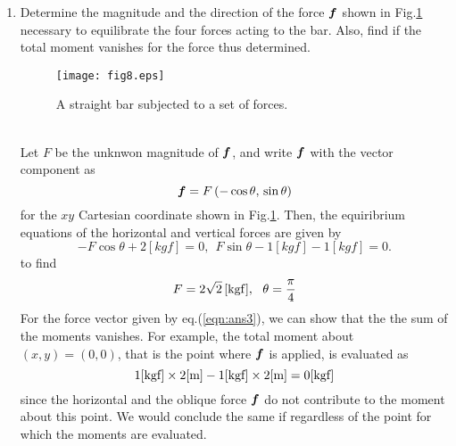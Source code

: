 \documentclass[10pt,a4j]{article}
\begin{document}
\begin{enumerate}
{		with respect to $P_1$ to $P_4$.
	}
\item
	Determine the magnitude and the direction of the force $\mbox{\boldmath $f$}$ shown in 
	Fig.\ref{fig:fig8} necessary to equilibrate the four forces acting to the bar.
	Also, find if the total moment vanishes for the force thus determined.  
	\begin{figure}[h]
		\begin{center}
		\texttt{[image: fig8.eps]} 
		\end{center}
		\caption{A straight bar subjected to a set of forces.} 
		\label{fig:fig8}
	\end{figure}
	\\

	{\small
		Let $F$ be the unknwon magnitude of $\mbox{\boldmath $f$}$, and write $\mbox{\boldmath $f$}$ with 
		the vector component as 
		\[
			\mbox{\boldmath $f$}=F \left( -\cos\theta,\, \sin\theta \right)
		\]
		for the $xy$ Cartesian coordinate shown in Fig.\ref{fig:fig8}. 
		Then, the equiribrium equations of the horizontal and vertical forces are 
		given by 
		\[
			-F\cos\theta + 2[kgf]=0, \ \ 
			F\sin\theta -1[kgf]-1[kgf]=0.
		\]
		to find 
		\begin{equation}
			F=2\sqrt{2} \,[{\rm kgf}], \ \ \theta=\frac{\pi}{4}
			\label{eqn:ans3}
		\end{equation}
		For the force vector given by eq.(\ref{eqn:ans3}), we can show that the 
		the sum of the moments vanishes.
		For example, the total moment about $(x,y)=(0,0)$, that is the point where $\mbox{\boldmath $f$}$ 
		is applied, is evaluated as  
		\[
			{\rm 1[kgf] \times 2[m] -1[kgf] \times 2[m]=0 [kgf] }
		\]
		since the horizontal and the oblique force $\mbox{\boldmath $f$}$ do not contribute to 
		the moment about this point. We would conclude the same if 
		regardless of the point for which the moments are evaluated. 	
	}

\end{enumerate}
\end{document}
